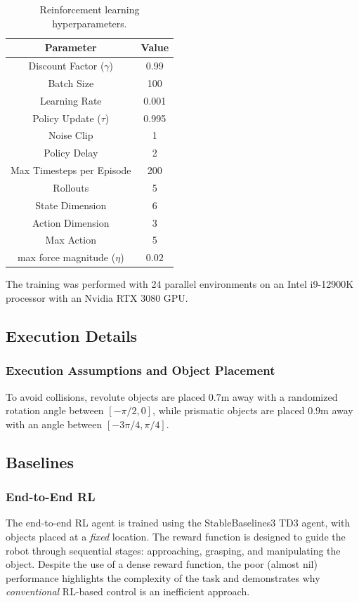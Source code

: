 \begin{table}[t]
\centering
\begin{tabular}{cc}
\toprule
\textbf{Parameter} & \textbf{Value} \\
\midrule
Discount Factor (\(\gamma\)) & 0.99 \\
Batch Size & 100 \\
Learning Rate & 0.001 \\
Policy Update (\(\tau\)) & 0.995 \\
Noise Clip & 1 \\
Policy Delay & 2 \\
Max Timesteps per Episode & 200 \\
Rollouts & 5 \\
State Dimension & 6 \\
Action Dimension & 3 \\
Max Action & 5 \\
 max force magnitude ($\eta$) & $0.02$\\
\bottomrule
\end{tabular}
\caption{Reinforcement learning hyperparameters.}
\end{table}

The training was performed with 24 parallel environments on an Intel i9-12900K processor with an Nvidia RTX 3080 GPU.

\subsection{Execution Details}

\subsubsection{Execution Assumptions and Object Placement}
To avoid collisions, revolute objects are placed $0.7$m away with a randomized rotation angle between \([- \pi/2, 0]\), while prismatic objects are placed $0.9$m away with an angle between \([-3\pi/4, \pi/4]\).

\subsection{Baselines}

\subsubsection{End-to-End RL}
The end-to-end RL agent is trained using the StableBaselines3 TD3 agent, with objects placed at a \textit{fixed} location. The reward function is designed to guide the robot through sequential stages: approaching, grasping, and manipulating the object. Despite the use of a dense reward function, the poor (almost nil) performance highlights the complexity of the task and demonstrates why \textit{conventional} RL-based control is an inefficient approach.

